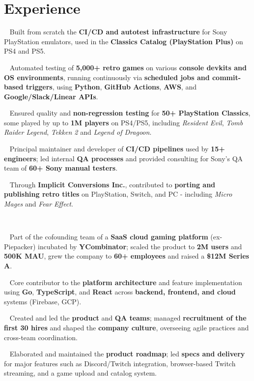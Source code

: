 \documentclass{muratcan_cv}
\renewcommand{\explanationdetail}[1]{%
    \indent \indent \begin{minipage}{0.87\linewidth} \scriptsize #1 \end{minipage} \\[0.03cm]
}
\begin{document}
\section{Experience}
%
\explanationdetail{
    \smallskip
    \ %
    Built from scratch the \textbf{CI/CD and autotest infrastructure} for Sony PlayStation emulators, used in the \textbf{Classics Catalog (PlayStation Plus)} on PS4 and PS5.

    \smallskip
    \coloredbullet\ %
    Automated testing of \textbf{5,000+ retro games} on various \textbf{console devkits and OS environments}, running continuously via \textbf{scheduled jobs and commit-based triggers}, using \textbf{Python}, \textbf{GitHub Actions}, \textbf{AWS}, and \textbf{Google/Slack/Linear APIs}.

    \smallskip
    \coloredbullet\ %
    Ensured quality and \textbf{non-regression testing} for \textbf{50+ PlayStation Classics}, some played by up to \textbf{1M players} on PS4/PS5, including \textit{Resident Evil}, \textit{Tomb Raider Legend}, \textit{Tekken 2} and \textit{Legend of Dragoon}.

    \smallskip
    \coloredbullet\ %
    Principal maintainer and developer of \textbf{CI/CD pipelines} used by \textbf{15+ engineers}; led internal \textbf{QA processes} and provided consulting for Sony's QA team of \textbf{60+ Sony manual testers}.

    \smallskip
    \coloredbullet\ %
    Through \textbf{Implicit Conversions Inc.}, contributed to \textbf{porting and publishing retro titles} on PlayStation, Switch, and PC - including \textit{Micro Mages} and \textit{Fear Effect}.
}
%
\explanationdetail{
    \smallskip
    \ %
    Part of the cofounding team of a \textbf{SaaS cloud gaming platform} (ex-Piepacker) incubated by \textbf{YCombinator}; scaled the product to \textbf{2M users} and \textbf{500K MAU}, grew the company to \textbf{60+ employees} and raised a \textbf{\$12M Series A}.

    \smallskip
    \coloredbullet\ %
    Core contributor to the \textbf{platform architecture} and feature implementation using \textbf{Go}, \textbf{TypeScript}, and \textbf{React} across \textbf{backend, frontend, and cloud} systems (Firebase, GCP).

    \smallskip
    \coloredbullet\ %
    Created and led the \textbf{product} and \textbf{QA teams}; managed \textbf{recruitment of the first 30 hires} and shaped the \textbf{company culture}, overseeing agile practices and cross-team coordination.

    \smallskip
    \coloredbullet\ %
    Elaborated and maintained the \textbf{product roadmap}; led \textbf{specs and delivery} for major features such as Discord/Twitch integration, browser-based Twitch streaming, and a game upload and catalog system.
}
\end{document}
